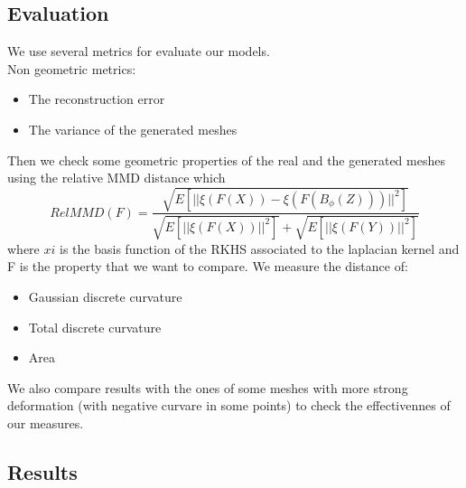\documentclass{article}
\begin{document}
\subsection{Evaluation}
We use several metrics for evaluate our models.	\\
Non geometric metrics:
\begin{itemize}
\item The reconstruction error 
\item The variance of the generated meshes
\end{itemize}
Then we check some geometric properties of the real and the generated meshes using the relative MMD distance which
$$RelMMD(F)=\frac{\sqrt{E[||\xi(F(X))-\xi(F(B_{\phi}(Z)))||^{2}]}}{\sqrt{E[||\xi(F(X))||^{2}]}+\sqrt{E[||\xi(F(Y))||^{2}]}}$$ where $xi$ is the basis function of the RKHS associated to the laplacian kernel and F is the property that we want to compare. We measure the distance of:
\begin{itemize}
\item Gaussian discrete curvature
\item Total discrete curvature
\item Area
\end{itemize}
We also compare results with the ones of some meshes with more strong deformation (with negative curvare in some points) to check the effectivennes of our measures.

\subsection{Results}
\end{document}

